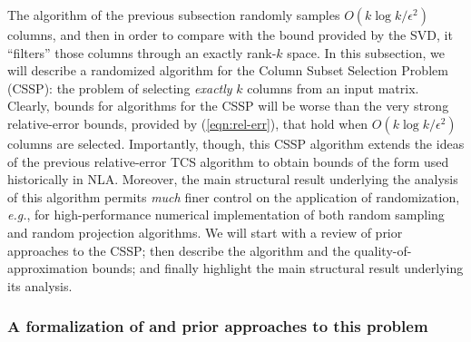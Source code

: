 \documentclass[twoside]{article}
\begin{document}
The algorithm of the previous subsection randomly samples 
$O(k \log k/\epsilon^2)$ columns, and then in order to compare with the 
bound provided by the SVD, it ``filters'' those columns through an exactly 
rank-$k$ space.
In this subsection, we will describe a randomized algorithm for the Column 
Subset Selection Problem (CSSP): the problem of selecting \emph{exactly} $k$ 
columns from an input matrix.
Clearly, bounds for algorithms for the CSSP will be worse than the very 
strong relative-error bounds, provided by (\ref{eqn:rel-err}), that hold 
when $O(k \log k / \epsilon^2)$ columns are selected.
Importantly, though, this CSSP algorithm extends the ideas of the previous 
relative-error TCS algorithm to obtain bounds of the form used historically 
in NLA.
Moreover, the main structural result underlying the analysis of this 
algorithm permits \emph{much} finer control on the application of 
randomization, \emph{e.g.}, for high-performance numerical implementation of 
both random sampling and random projection algorithms.
We will start with a review of prior approaches to the CSSP;
then describe the algorithm and the  
quality-of-approximation bounds; and finally highlight the main structural 
result underlying its analysis.


\subsubsection{A formalization of and prior approaches to this problem}
\end{document}
